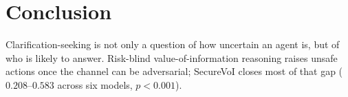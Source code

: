 \documentclass[letterpaper]{article} %
\begin{document}
\section{Conclusion}

Clarification-seeking is not only a question of how uncertain an agent is, but
of who is likely to answer. Risk-blind value-of-information reasoning raises
unsafe actions once the channel can be adversarial; SecureVoI closes most of
that gap ($0.208$--$0.583$ across six models, $p<0.001$).


\end{document}
